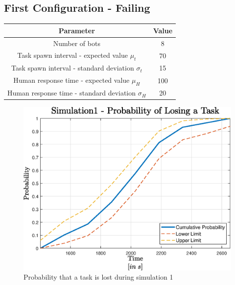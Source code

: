 \documentclass{article}
\begin{document}
		\subsection{First Configuration - Failing}
			\label{sub:sim1}
			\begin{center}
				\begin{tabular}{ |c|c|}
					\hline
					Parameter & Value \\
					\hline
					\hline
					Number of bots & 8\\
					\hline
					Task spawn interval - expected value $\mu_t$ & 70\\
					\hline					
					Task spawn interval - standard deviation $\sigma_t$ & 15\\
					\hline
					Human response time - expected value $\mu_H$ & 100\\
					\hline					
					Human response time - standard deviation $\sigma_H$ & 20\\
					\hline
				\end{tabular}
			\end{center}
			\begin{figure}[H]
				\centering
					\includegraphics[scale = 0.7]{Images/Simulation1}
					\caption{Probability that a task is lost during simulation 1}
					\label{fig:sim1}
			\end{figure}
		
\end{document}
